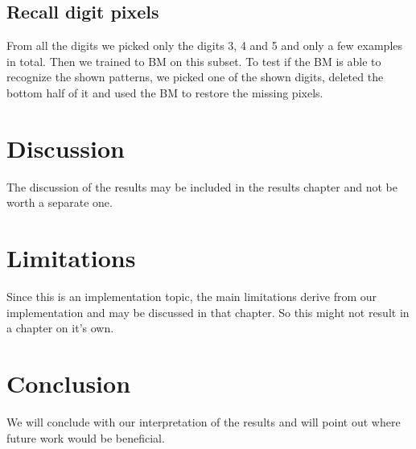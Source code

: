 \documentclass[12pt,twoside]{article}
\theoremstyle{plain}
\theoremstyle{definition}
\theoremstyle{remark}
\begin{document}
\subsection{Recall digit pixels}

From all the digits we picked only the digits 3, 4 and 5 and only a few examples in total. Then we trained to BM on this subset. To test if the BM is able to recognize the shown patterns, we picked one of the shown digits, deleted the bottom half of it and used the BM to restore the missing pixels.


\section{Discussion}
\label{sec:discuss}

The discussion of the results may be included in the results chapter and not be worth a separate one. %


\section{Limitations}
\label{sec:limits}

Since this is an implementation topic, the main limitations derive from our implementation and may be discussed in that chapter. So this might not result in a chapter on it's own. %


\section{Conclusion}
\label{sec:concl}

We will conclude with our interpretation of the results and will point out where future work would be beneficial.


%
%
\newpage


\end{document}
